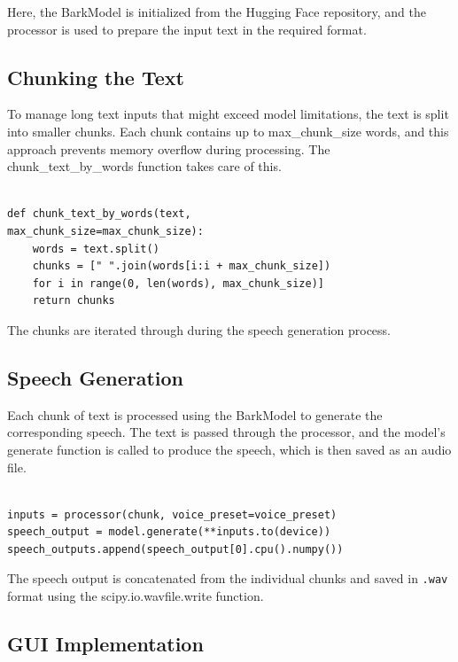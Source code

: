 \documentclass[12pt, a4paper]{article}
\begin{document}
Here, the BarkModel is initialized from the Hugging Face repository, and the processor is used to prepare the input text in the required format.

\subsection{Chunking the Text}

To manage long text inputs that might exceed model limitations, the text is split into smaller chunks. Each chunk contains up to max\_chunk\_size words, and this approach prevents memory overflow during processing. The chunk\_text\_by\_words function takes care of this.

\begin{verbatim}

def chunk_text_by_words(text, 
max_chunk_size=max_chunk_size):
    words = text.split()
    chunks = [" ".join(words[i:i + max_chunk_size]) 
    for i in range(0, len(words), max_chunk_size)]
    return chunks

\end{verbatim}

The chunks are iterated through during the speech generation process.

\subsection{Speech Generation}

Each chunk of text is processed using the BarkModel to generate the corresponding speech. The text is passed through the processor, and the model’s generate function is called to produce the speech, which is then saved as an audio file.

\begin{verbatim}

inputs = processor(chunk, voice_preset=voice_preset)
speech_output = model.generate(**inputs.to(device))
speech_outputs.append(speech_output[0].cpu().numpy())

\end{verbatim}

The speech output is concatenated from the individual chunks and saved in \texttt{.wav} format using the scipy.io.wavfile.write function.

\subsection{GUI Implementation}
\end{document}
